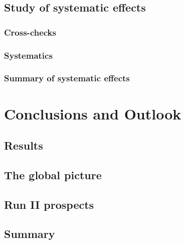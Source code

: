 \section{Study of systematic effects}
\subsection{Cross-checks}
\subsection{Systematics}
\subsection{Summary of systematic effects}

\chapter{Conclusions and Outlook}
\section{Results}
\section{The global picture}
\section{Run II prospects}
\section{Summary}
